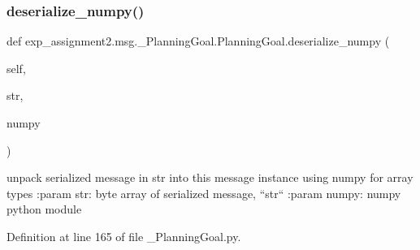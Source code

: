 \subsubsection{\texorpdfstring{deserialize\+\_\+numpy()}{deserialize\_numpy()}}
{\footnotesize\ttfamily def exp\+\_\+assignment2.\+msg.\+\_\+\+Planning\+Goal.\+Planning\+Goal.\+deserialize\+\_\+numpy (\begin{DoxyParamCaption}\item[{}]{self,  }\item[{}]{str,  }\item[{}]{numpy }\end{DoxyParamCaption})}

\begin{DoxyVerb}unpack serialized message in str into this message instance using numpy for array types
:param str: byte array of serialized message, ``str``
:param numpy: numpy python module
\end{DoxyVerb}
 

Definition at line 165 of file \+\_\+\+Planning\+Goal.\+py.


